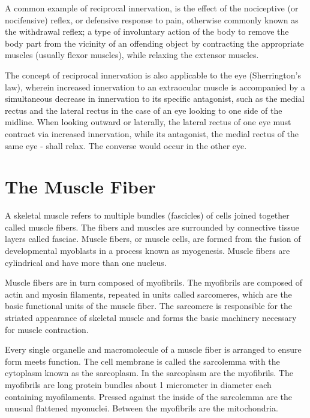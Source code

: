 A common example of reciprocal innervation, is the effect of the nociceptive (or nocifensive) reflex, or defensive response to pain, otherwise commonly known as the withdrawal reflex; a type of involuntary action of the body to remove the body part from the vicinity of an offending object by contracting the appropriate muscles (usually flexor muscles), while relaxing the extensor muscles.

The concept of reciprocal innervation is also applicable to the eye (Sherrington's law), wherein increased innervation to an extraocular muscle is accompanied by a simultaneous decrease in innervation to its specific antagonist, such as the medial rectus and the lateral rectus in the case of an eye looking to one side of the midline. When looking outward or laterally, the lateral rectus of one eye must contract via increased innervation, while its antagonist, the medial rectus of the same eye - shall relax. The converse would occur in the other eye.

\hypertarget{the-muscle-fiber}{%
\section{The Muscle Fiber}\label{the-muscle-fiber}}

A skeletal muscle refers to multiple bundles (fascicles) of cells joined together called muscle fibers. The fibers and muscles are surrounded by connective tissue layers called fasciae. Muscle fibers, or muscle cells, are formed from the fusion of developmental myoblasts in a process known as myogenesis. Muscle fibers are cylindrical and have more than one nucleus.

Muscle fibers are in turn composed of myofibrils. The myofibrils are composed of actin and myosin filaments, repeated in units called sarcomeres, which are the basic functional units of the muscle fiber. The sarcomere is responsible for the striated appearance of skeletal muscle and forms the basic machinery necessary for muscle contraction.

Every single organelle and macromolecule of a muscle fiber is arranged to ensure form meets function. The cell membrane is called the sarcolemma with the cytoplasm known as the sarcoplasm. In the sarcoplasm are the myofibrils. The myofibrils are long protein bundles about 1 micrometer in diameter each containing myofilaments. Pressed against the inside of the sarcolemma are the unusual flattened myonuclei. Between the myofibrils are the mitochondria.

